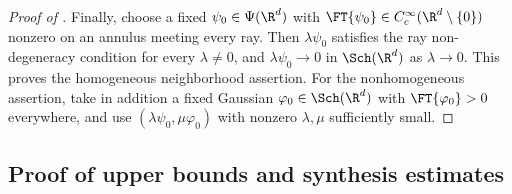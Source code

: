 \begin{proof}[Proof of ]
Finally, choose a fixed \(\psi_0\in\Psi(\R^d)\) with \(\FT{\psi_0}\in C^\infty_c(\R^d\setminus\{0\})\) nonzero on an annulus meeting every ray.
Then \(\lambda\psi_0\) satisfies the ray non-degeneracy condition for every \(\lambda\neq0\), and \(\lambda\psi_0\to0\) in \(\Sch(\R^d)\) as \(\lambda\to0\).
This proves the homogeneous neighborhood assertion.
For the nonhomogeneous assertion, take in addition a fixed Gaussian \(\varphi_0\in\Sch(\R^d)\) with \(\FT{\varphi_0}>0\) everywhere, and use \((\lambda\psi_0,\mu\varphi_0)\) with nonzero \(\lambda,\mu\) sufficiently small.
\end{proof}

\subsection{Proof of upper bounds and synthesis estimates}


